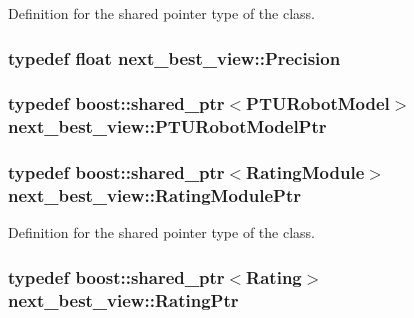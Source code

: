 \-Definition for the shared pointer type of the class. 

\hypertarget{namespacenext__best__view_a471681a7c47e921eda8b6b1ba32b1786}{
\subsubsection[{\-Precision}]{\setlength{\rightskip}{0pt plus 5cm}typedef float {\bf next\-\_\-best\-\_\-view\-::\-Precision}}}\label{namespacenext__best__view_a471681a7c47e921eda8b6b1ba32b1786}
\hypertarget{namespacenext__best__view_a7ee94aa7b8bb9e1c79328745b92d12b8}{
\subsubsection[{\-P\-T\-U\-Robot\-Model\-Ptr}]{\setlength{\rightskip}{0pt plus 5cm}typedef boost\-::shared\-\_\-ptr$<${\bf \-P\-T\-U\-Robot\-Model}$>$ {\bf next\-\_\-best\-\_\-view\-::\-P\-T\-U\-Robot\-Model\-Ptr}}}\label{namespacenext__best__view_a7ee94aa7b8bb9e1c79328745b92d12b8}
\hypertarget{namespacenext__best__view_a0fd3a238157d0632d802531f590682ec}{
\subsubsection[{\-Rating\-Module\-Ptr}]{\setlength{\rightskip}{0pt plus 5cm}typedef boost\-::shared\-\_\-ptr$<${\bf \-Rating\-Module}$>$ {\bf next\-\_\-best\-\_\-view\-::\-Rating\-Module\-Ptr}}}\label{namespacenext__best__view_a0fd3a238157d0632d802531f590682ec}


\-Definition for the shared pointer type of the class. 

\hypertarget{namespacenext__best__view_a24cf26ec1dec2cc4c167e32798d1abeb}{
\subsubsection[{\-Rating\-Ptr}]{\setlength{\rightskip}{0pt plus 5cm}typedef boost\-::shared\-\_\-ptr$<${\bf \-Rating}$>$ {\bf next\-\_\-best\-\_\-view\-::\-Rating\-Ptr}}}\label{namespacenext__best__view_a24cf26ec1dec2cc4c167e32798d1abeb}



